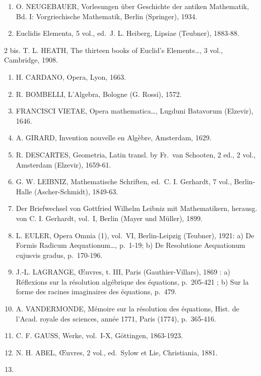 
\begin{enumerate}
\def\labelenumi{\arabic{enumi}.}
\item
  O. NEUGEBAUER, Vorlesungen über Geschichte der antiken Mathematik, Bd. I: Vorgriechische Mathematik, Berlin (Springer), 1934.
\item
  Euclidis Elementa, 5 vol., ed.~J. L. Heiberg, Lipsiae (Teubner), 1883-88.
\end{enumerate}

2 bis. T. L. HEATH, The thirteen books of Euclid's Elements\ldots, 3 vol., Cambridge, 1908.

\begin{enumerate}
\def\labelenumi{\arabic{enumi}.}
\setcounter{enumi}{2}
\item
  H. CARDANO, Opera, Lyon, 1663.
\item
  R. BOMBELLI, L'Algebra, Bologne (G. Rossi), 1572.
\item
  FRANCISCI VIETAE, Opera mathematica\ldots, Lugduni Batavorum (Elzevir), 1646.
\item
  A. GIRARD, Invention nouvelle en Algèbre, Amsterdam, 1629.
\item
  R. DESCARTES, Geometria, Latin transl. by Fr.~van Schooten, 2 ed., 2 vol., Amsterdam (Elzevir), 1659-61.
\item
  G. W. LEIBNIZ, Mathematische Schriften, ed.~C. I. Gerhardt, 7 vol., Berlin-Halle (Ascher-Schmidt), 1849-63.
\item
  Der Briefwechsel von Gottfried Wilhelm Leibniz mit Mathematikern, herausg. von C. I. Gerhardt, vol.~I, Berlin (Mayer und Müller), 1899.
\item
  L. EULER, Opera Omnia (1), vol.~VI, Berlin-Leipzig (Teubner), 1921: a) De Formis Radicum Aequationum\ldots, p.~1-19; b) De Resolutione Aequationum cujusvis gradus, p.~170-196.
\item
  J.-L. LAGRANGE, Œuvres, t. III, Paris (Gauthier-Villars), 1869 : a) Réflexions sur la résolution algébrique des équations, p.~205-421 ; b) Sur la forme des racines imaginaires des équations, p.~479.
\item
  A. VANDERMONDE, Mémoire sur la résolution des équations, Hist. de l'Acad. royale des sciences, année 1771, Paris (1774), p.~365-416.
\item
  C. F. GAUSS, Werke, vol.~I-X, Göttingen, 1863-1923.
\item
  N. H. ABEL, Œuvres, 2 vol., ed.~Sylow et Lie, Christiania, 1881.
\item

\end{enumerate}
